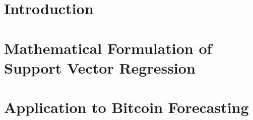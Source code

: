 \section{Introduction}


\section{Mathematical Formulation of Support Vector Regression}


\section{Application to Bitcoin Forecasting}

